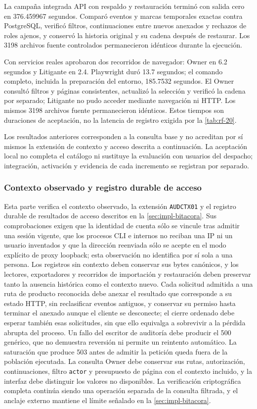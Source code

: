 La campaña integrada API con respaldo y restauración terminó con salida cero
en 376.459967 segundos. Comparó eventos y marcas temporales exactas contra
PostgreSQL, verificó filtros, continuaciones entre nuevos anexados y rechazos de
roles ajenos, y conservó la historia original y su cadena después de restaurar.
Los 3198 archivos fuente controlados permanecieron idénticos durante la ejecución.

Con servicios reales aprobaron dos recorridos de navegador: Owner en 6.2 segundos
y Litigante en 2.4. Playwright duró 13.7 segundos; el comando completo, incluida
la preparación del entorno, 185.7532 segundos. El Owner consultó filtros y páginas
consistentes, actualizó la selección y verificó la cadena por separado; Litigante
no pudo acceder mediante navegación ni HTTP. Los mismos 3198 archivos fuente
permanecieron idénticos. Estos tiempos son duraciones de aceptación, no la
latencia de registro exigida por la \cref{tab:rf-20}.

Los resultados anteriores corresponden a la consulta base y no acreditan por
sí mismos la extensión de contexto y acceso descrita a continuación. La
aceptación local no completa el catálogo ni sustituye la evaluación con usuarios
del despacho; integración, activación y evidencia de cada incremento se
registran por separado.

\subsubsection{Contexto observado y registro durable de acceso}
\label{sec:pruebas-bitacora-contexto}
Esta parte verifica el contexto observado, la extensión \texttt{AUDCTX01} y el
registro durable de resultados de acceso descritos en la \cref{sec:impl-bitacora}.
Sus comprobaciones exigen que la identidad de cuenta sólo se vincule tras admitir
una sesión vigente, que los procesos CLI e internos no reciban una IP ni un
usuario inventados y que la dirección reenviada sólo se acepte en el modo
explícito de proxy loopback; esta observación no identifica por sí sola a una
persona. Los registros sin contexto deben conservar sus bytes canónicos, y los
lectores, exportadores y recorridos de importación y restauración deben preservar
tanto la ausencia histórica como el contexto nuevo. Cada solicitud admitida a
una ruta de producto reconocida debe anexar el resultado que corresponde a su
estado HTTP, sin reclasificar eventos antiguos, y conservar su permiso hasta terminar el anexado aunque el cliente se
desconecte; el cierre ordenado debe esperar también esas solicitudes, sin que
ello equivalga a sobrevivir a la pérdida abrupta del proceso. Un fallo del
escritor de auditoría debe producir el 500 genérico, que no demuestra reversión
ni permite un reintento automático. La saturación que produce 503 antes de
admitir la petición queda fuera de la población ejecutada. La consulta Owner
debe conservar sus rutas, autorización, continuaciones, filtro \texttt{actor} y presupuesto de página con
el contexto incluido, y la interfaz debe distinguir los valores no disponibles.
La verificación criptográfica completa continúa siendo una operación separada
de la consulta filtrada, y el anclaje externo mantiene el límite señalado en la
\cref{sec:impl-bitacora}.

